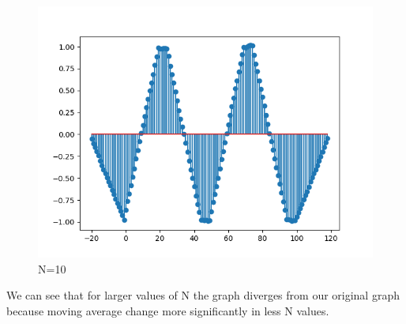 \documentclass[10pt,a4paper, margin=1in]{article}
\begin{document}
\begin{enumerate}
\begin{enumerate}
\begin{figure}[H]
        \includegraphics[scale=0.75]{7b_4.png}
        \caption{N=10}
    \end{figure}
    We can see that for larger values of N the graph diverges from our original graph because moving average change more significantly in less N values.
    \end{enumerate}    

\end{enumerate}
\end{document}
